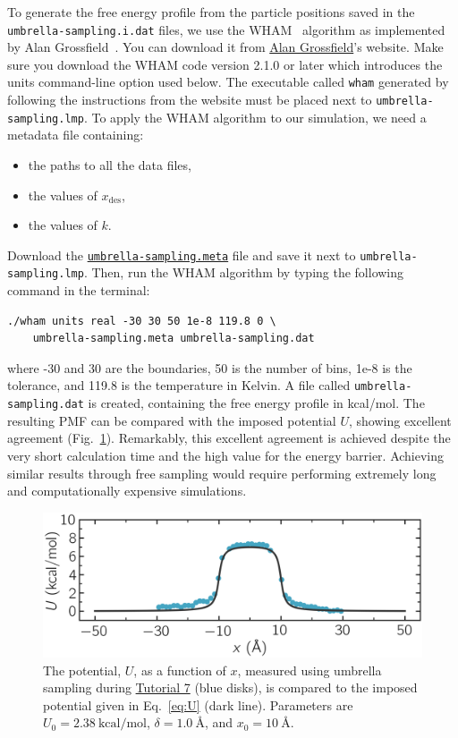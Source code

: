 \documentclass[9pt,tutorial]{livecoms}
\newcommand{\lmpcmd}[1]{\hspace{0pt}\colorbox{listing}{\textcolor{command}{\small{#1}}}\hspace{0pt}} %
\newcommand{\flecmd}[1]{\textcolor{command}{\texttt{#1}}} %
\newcommand{\dwlcmd}[1]{\textcolor{download}{\texttt{#1}}} %
\newcommand{\filepath}{https://raw.githubusercontent.com/lammpstutorials/lammpstutorials-article/main/files/}
\begin{document}
To generate the free energy profile from the particle positions saved in
the \flecmd{umbrella-sampling.i.dat} files, we use the
WHAM~\cite{kumar1992weighted,kumar1995multidim} algorithm as implemented
by Alan Grossfield~\cite{grossfieldimplementation}.  You can download it
from \href{http://membrane.urmc.rochester.edu/?page_id=126}{Alan
  Grossfield}'s website.  Make sure you download the WHAM code version
2.1.0 or later which introduces the \lmpcmd{units} command-line option
used below. The executable called \flecmd{wham} generated by following
the instructions from the website must be placed next to
\flecmd{umbrella-sampling.lmp}.  To apply the WHAM algorithm to our
simulation, we need a metadata file containing:
\begin{itemize}
\item the paths to all the data files,
\item the values of $x_\text{des}$,
\item the values of $k$.
\end{itemize}
Download the
\href{\filepath tutorial7/umbrella-sampling.meta}{\dwlcmd{umbrella-sampling.meta}}
file and save it next to \flecmd{umbrella-sampling.lmp}.  Then, run the
WHAM algorithm by typing the following command in the terminal:
\begin{lstlisting}
./wham units real -30 30 50 1e-8 119.8 0 \
    umbrella-sampling.meta umbrella-sampling.dat
\end{lstlisting}
where -30 and 30 are the boundaries, 50 is the number of bins, 1e-8 is the tolerance,
and 119.8 is the temperature in Kelvin.  A file called \flecmd{umbrella-sampling.dat} is created,
containing the free energy profile in kcal/mol.  The resulting PMF can be compared
with the imposed potential $U$, showing excellent agreement
(Fig.~\ref{fig:US-freenergy}).  Remarkably, this excellent agreement is achieved despite
the very short calculation time and the high value for the energy barrier.
Achieving similar results through free sampling would require performing extremely
long and computationally expensive simulations.

\begin{figure}
\centering
\includegraphics[width=\linewidth]{US-free-energy}
\caption{The potential, $U$, as a function of $x$, measured using umbrella
sampling during \hyperref[umbrella-sampling-label]{Tutorial 7} (blue disks),
is compared to the imposed potential given in Eq.~\eqref{eq:U}
(dark line).  Parameters are $U_0 = 2.38~\text{kcal/mol}$, $\delta = 1.0~\text{\AA{}}$,
and $x_0 = 10~\text{\AA{}}$.}
\label{fig:US-freenergy}
\end{figure}
\end{document}
